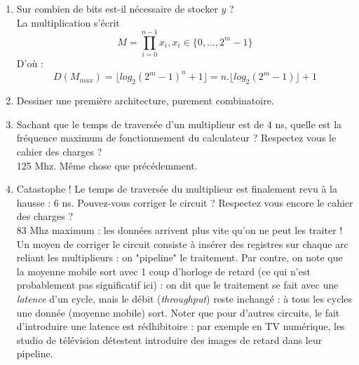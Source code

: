 \documentclass[a4paper,11pt]{article}
\begin{document}
\begin{enumerate}
  \item Sur combien de bits est-il nécessaire de stocker $y$ ? \\
   La multiplication s'écrit $$M=\prod_{i=0}^{n-1} x_i, x_i \in \{0,\dots,2^m-1 \}$$
  D'où :
  $$D(M_{max})=\lfloor log_2(2^m-1)^n +1\rfloor=n.\lfloor log_2(2^m-1)\rfloor + 1$$
  \item Dessiner une première architecture, purement combinatoire.\\

  \item Sachant que le temps de traversée d'un multiplieur est de 4 ns, quelle est la fréquence maximum de fonctionnement du calculateur ? Respectez vous le cahier des charges ? \\
   125 Mhz. Même chose que précédemment.

  \item Catastophe ! Le temps de traversée du multiplieur est finalement revu à la hausse : 6 ns. Pouvez-vous corriger le circuit ? Respectez vous encore le cahier des charges ? \\
   83 Mhz maximum : les données arrivent plus vite qu'on ne peut les traiter ! Un moyen de corriger le circuit consiste à insérer des registres sur chaque arc reliant les multiplieurs : on "pipeline"
  le traitement. Par contre, on note que la moyenne mobile sort avec 1 coup d'horloge de retard (ce qui n'est probablement pas significatif ici) : on dit que le traitement se fait avec une {\it latence} d'un cycle, mais
  le débit ({\it throughput}) reste inchangé : à tous les cycles une donnée (moyenne mobile) sort. Noter que pour d'autres circuits, le fait d'introduire une latence est rédhibitoire : par exemple en TV numérique, les
  studio de télévision détestent introduire des images de retard dans leur pipeline.

\end{enumerate}
\end{document}
